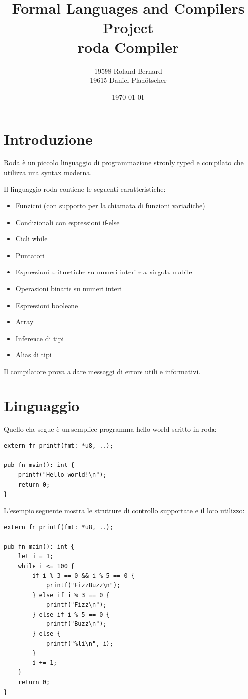 \documentclass[a4paper]{article}
\title{
Formal Languages and Compilers \\
Project \\
roda Compiler
}
\author{
    19598 Roland Bernard \\
    19615 Daniel Planötscher
}
\date{\today}
\begin{document}
\maketitle

\section{Introduzione}

Roda è un piccolo linguaggio di programmazione stronly typed e compilato che utilizza una syntax moderna.

Il linguaggio roda contiene le seguenti caratteristiche:
\begin{itemize}
    \item Funzioni (con supporto per la chiamata di funzioni variadiche)
    \item Condizionali con espressioni if-else
    \item Cicli while
    \item Puntatori
    \item Espressioni aritmetiche su numeri interi e a virgola mobile
    \item Operazioni binarie su numeri interi
    \item Espressioni booleane
    \item Array
    \item Inference di tipi
    \item Alias di tipi
\end{itemize}

Il compilatore prova a dare messaggi di errore utili e informativi.

\section{Linguaggio}

Quello che segue è un semplice programma hello-world scritto in roda:
\begin{verbatim}
extern fn printf(fmt: *u8, ..);

pub fn main(): int {
    printf("Hello world!\n");
    return 0;
}
\end{verbatim}

L'esempio seguente mostra le strutture di controllo supportate e il loro utilizzo:
\begin{verbatim}
extern fn printf(fmt: *u8, ..);

pub fn main(): int {
    let i = 1;
    while i <= 100 {
        if i % 3 == 0 && i % 5 == 0 {
            printf("FizzBuzz\n");
        } else if i % 3 == 0 {
            printf("Fizz\n");
        } else if i % 5 == 0 {
            printf("Buzz\n");
        } else {
            printf("%li\n", i);
        }
        i += 1;
    }
    return 0;
}
\end{verbatim}
\end{document}
